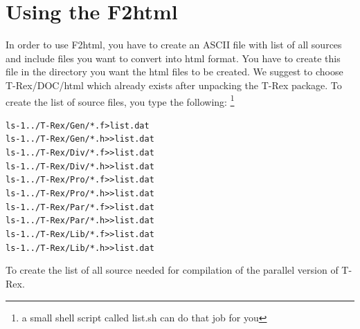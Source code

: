 \documentclass[10pt]{article}
\newcommand*{\tc}{\ttfamily} %
\newcommand*{\tn}{\sffamily} %
\begin{document}
%
    \newpage
    \section{Using the {\tn F2html}}
%

    In order to use {\tn F2html}, you have to create an ASCII
    file with list of all sources and include files you want to 
    convert into html format. You have to create this file in
    the directory you want the html files to be created. We 
    suggest to choose {\tc T-Rex/DOC/html} which already
    exists after unpacking the {\tn T-Rex} package. To create
    the list of source files, you type the following:
      \footnote{a small shell script called {\tc list.sh}
      can do that job for you}
    \small
    \begin{alltt}
    ls -1 ../T-Rex/Gen/*.f > list.dat
    ls -1 ../T-Rex/Gen/*.h >> list.dat
    ls -1 ../T-Rex/Div/*.f >> list.dat
    ls -1 ../T-Rex/Div/*.h >> list.dat
    ls -1 ../T-Rex/Pro/*.f >> list.dat
    ls -1 ../T-Rex/Pro/*.h >> list.dat
    ls -1 ../T-Rex/Par/*.f >> list.dat
    ls -1 ../T-Rex/Par/*.h >> list.dat
    ls -1 ../T-Rex/Lib/*.f >> list.dat
    ls -1 ../T-Rex/Lib/*.h >> list.dat
    \end{alltt}
    \normalsize
    To create the list of all source needed for compilation of
    the parallel version of {\tn T-Rex}. 
\end{document}
